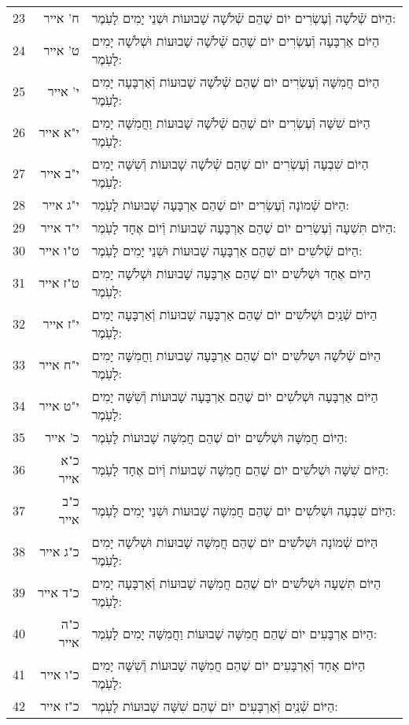 \documentclass[twoside, openany, parskip=half, 11pt]{book}
\begin{document}
\begin{scriptsize}
\begin{longtable}{ l | r | p{} }
23 & ח' אייר & הַיּוֹם שְֿׁלֹשָׁה וְֿעֶשְׂרִים יוֹם שֶׁהֵם שְֿׁלֹשָׁה שָׁבוּעוֹת וּשְׁנֵי יָמִים לָעֹֽמֶר: \\
24 & ט' אייר & הַיּוֹם אַרְבָּעָה וְֿעֶשְׂרִים יוֹם שֶׁהֵם שְֿׁלֹשָׁה שָׁבוּעוֹת וּשְׁלֹשָׁה יָמִים לָעֹֽמֶר: \\
25 & י' אייר & הַיּוֹם חֲמִשָּׁה וְֿעֶשְׂרִים יוֹם שֶׁהֵם שְֿׁלֹשָׁה שָׁבוּעוֹת וְֿאַרְבָּעָה יָמִים לָעֹֽמֶר: \\
26 & י"א אייר & הַיּוֹם שִׁשָּׁה וְֿעֶשְׂרִים יוֹם שֶׁהֵם שְֿׁלֹשָׁה שָׁבוּעוֹת וַחֲמִשָּׁה יָמִים לָעֹֽמֶר: \\
27 & י"ב אייר & הַיּוֹם שִׁבְעָה וְֿעֶשְׂרִים יוֹם שֶׁהֵם שְֿׁלֹשָׁה שָׁבוּעוֹת וְֿשִׁשָּׁה יָמִים לָעֹֽמֶר: \\
28 & י"ג אייר & הַיּוֹם שְֿׁמוֹנָה וְֿעֶשְׂרִים יוֹם שֶׁהֵם אַרְבָּעָה שָׁבוּעוֹת לָעֹֽמֶר: \\
29 & י"ד אייר & הַיּוֹם תִּשְׁעָה וְֿעֶשְׂרִים יוֹם שֶׁהֵם אַרְבָּעָה שָׁבוּעוֹת וְֿיוֹם אֶחָד לָעֹֽמֶר: \\
30 & ט"ו אייר & הַיּוֹם שְֿׁלֹשִׁים יוֹם שֶׁהֵם אַרְבָּעָה שָׁבוּעוֹת וּשְׁנֵי יָמִים לָעֹֽמֶר: \\
31 & ט"ז אייר & הַיּוֹם אֶחָד וּשְׁלֹשִׁים יוֹם שֶׁהֵם אַרְבָּעָה שָׁבוּעוֹת וּשְׁלֹשָׁה יָמִים לָעֹֽמֶר: \\
32 & י"ז אייר & הַיּוֹם שְֿׁנַֽיִם וּשְׁלֹשִׁים יוֹם שֶׁהֵם אַרְבָּעָה שָׁבוּעוֹת וְֿאַרְבָּעָה יָמִים לָעֹֽמֶר: \\
33 & י"ח אייר & הַיּוֹם שְֿׁלֹשָׁה וּשְלֹשִׁים יוֹם שֶׁהֵם אַרְבָּעָה שָׁבוּעוֹת וַחֲמִשָּׁה יָמִים לָעֹֽמֶר: \\
34 & י"ט אייר & הַיּוֹם אַרְבָּעָה וּשְׁלֹשִׁים יוֹם שֶׁהֵם אַרְבָּעָה שָׁבוּעוֹת וְֿשִׁשָּׁה יָמִים לָעֹֽמֶר: \\
35 & כ' אייר & הַיּוֹם חֲמִשָּׁה וּשְׁלֹשִׁים יוֹם שֶׁהֵם חֲמִשָּׁה שָׁבוּעוֹת לָעֹֽמֶר: \\
36 & כ"א אייר & הַיּוֹם שִׁשָּׁה וּשְׁלֹשִׁים יוֹם שֶׁהֵם חֲמִשָּׁה שָׁבוּעוֹת וְֿיוֹם אֶחָד לָעֹֽמֶר: \\
37 & כ"ב אייר & הַיּוֹם שִׁבְעָה וּשְׁלֹשִׁים יוֹם שֶׁהֵם חֲמִשָּׁה שָׁבוּעוֹת וּשְׁנֵי יָמִים לָעֹֽמֶר: \\
38 & כ"ג אייר & הַיּוֹם שְֿׁמוֹנָה וּשְׁלֹשִׁים יוֹם שֶׁהֵם חֲמִשָּׁה שָׁבוּעוֹת וּשְׁלֹשָׁה יָמִים לָעֹֽמֶר: \\
39 & כ"ד אייר & הַיּוֹם תִּשְׁעָה וּשְׁלֹשִׁים יוֹם שֶׁהֵם חֲמִשָּׁה שָׁבוּעוֹת וְֿאַרְבָּעָה יָמִים לָעֹֽמֶר: \\
40 & כ"ה אייר & הַיּוֹם אַרְבָּעִים יוֹם שֶׁהֵם חֲמִשָּׁה שָׁבוּעוֹת וַחֲמִשָּׁה יָמִים לָעֹֽמֶר: \\
41 & כ"ו אייר & הַיּוֹם אֶחָד וְֿאַרְבָּעִים יוֹם שֶׁהֵם חֲמִשָּׁה שָׁבוּעוֹת וְֿשִׁשָּׁה יָמִים לָעֹֽמֶר: \\
42 & כ"ז אייר & הַיּוֹם שְֿׁנַֽיִם וְֿאַרְבָּעִים יוֹם שֶׁהֵם שִׁשָּׁה שָׁבוּעוֹת לָעֹֽמֶר: \\

\end{longtable}
\end{scriptsize}
\end{document}
